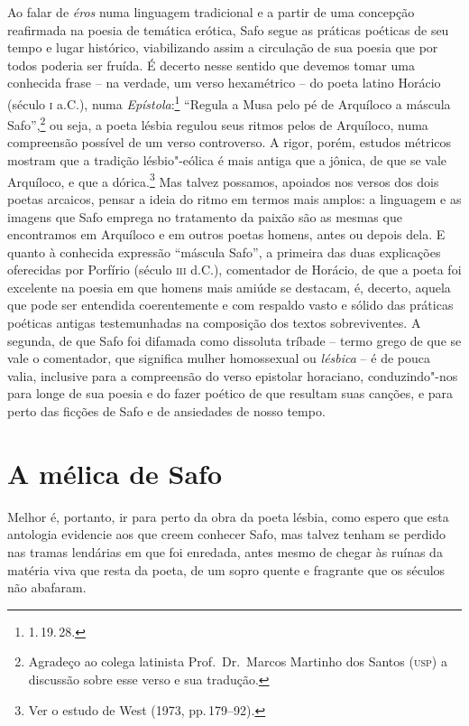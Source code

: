 Ao falar de \textit{éros} numa linguagem tradicional e a partir de uma concepção
reafirmada na poesia de temática erótica, Safo segue as práticas poéticas de
seu tempo e lugar histórico, viabilizando assim a circulação de sua poesia
que por todos poderia ser fruída. É decerto nesse sentido que
devemos tomar uma conhecida frase -- na verdade, um verso hexamétrico -- do poeta
latino Horácio (século \textsc{i} a.C.), numa \textit{Epístola}:\footnote{1.\,19.\,28.}
``Regula a Musa pelo pé de Arquíloco a máscula Safo”,\footnote{ Agradeço
ao colega latinista Prof.~Dr.~Marcos Martinho dos Santos (\textsc{usp}) a discussão sobre esse verso e
sua tradução.} ou seja, a poeta lésbia regulou seus ritmos pelos de Arquíloco,
numa compreensão possível de um verso controverso. A rigor, porém,
estudos métricos mostram que a tradição lésbio"-eólica é mais antiga que a
jônica, de que se vale Arquíloco, e que a dórica.\footnote{ Ver o estudo de West
(1973, pp.\,179--92).} Mas talvez possamos, apoiados nos versos dos dois poetas
arcaicos, pensar a ideia do ritmo em termos mais amplos: a linguagem e
as imagens que Safo emprega no tratamento da paixão são as mesmas que
encontramos em Arquíloco e em outros poetas homens, antes ou depois dela. E
quanto à conhecida expressão ``máscula Safo”, a primeira das duas
explicações oferecidas por Porfírio (século \textsc{iii} d.C.), comentador de Horácio,
de que a poeta foi excelente na poesia em que homens mais amiúde se
destacam, é, decerto, aquela que pode ser entendida coerentemente e com
respaldo vasto e sólido das práticas poéticas antigas testemunhadas na
composição dos textos sobreviventes. A segunda, de que Safo foi difamada como
dissoluta tríbade -- termo grego de que se vale o comentador, que significa
mulher homossexual ou \textit{lésbica} -- é de pouca valia, inclusive para a
compreensão do verso epistolar horaciano, conduzindo"-nos para longe de sua
poesia e do fazer poético de que resultam suas canções, e para perto das
ficções de Safo e de ansiedades de nosso tempo. 


\section*{A mélica de Safo}

Melhor é, portanto, ir para perto da obra da poeta lésbia, como espero que esta
antologia evidencie aos que creem conhecer Safo, mas talvez tenham se perdido
nas tramas lendárias em que foi enredada, antes mesmo de chegar às ruínas da
matéria viva que resta da poeta, de um sopro quente e fragrante que os séculos
não abafaram.

